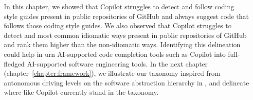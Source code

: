 In this chapter, we showed that Copilot struggles to detect and follow coding style guides  present in public repositories of GitHub and always suggest code that follows those coding style guides. We also observed that Copilot struggles to detect and most common idiomatic ways present in public repositories of GitHub and rank them higher than the non-idiomatic ways. 
Identifying this delineation could help in urn AI-supported code completion tools such as Copilot into full-fledged AI-supported software engineering tools.
In the next chapter (chapter~\ref{chapter:framework}), we illustrate our taxonomy inspired from autonomous driving levels on the software abstraction hierarchy in \AISE{}, and delineate where \cct{} like Copilot currently stand in the taxonomy. 